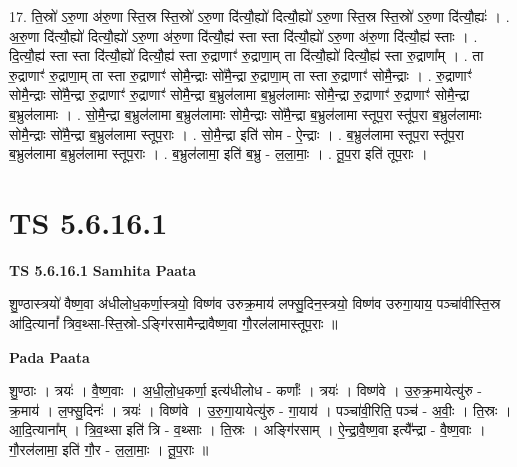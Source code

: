 \documentclass[17pt]{extarticle}
\begin{document}
17. ति॒स्रो॑ ऽरु॒णा अ॑रु॒णा स्ति॒स्र स्ति॒स्रो॑ ऽरु॒णा दि॑त्यौ॒ह्यो॑ दित्यौ॒ह्यो॑ ऽरु॒णा स्ति॒स्र स्ति॒स्रो॑ ऽरु॒णा दि॑त्यौ॒ह्यः॑ । . अ॒रु॒णा दि॑त्यौ॒ह्यो॑ दित्यौ॒ह्यो॑ ऽरु॒णा अ॑रु॒णा दि॑त्यौ॒ह्य॑ स्ता स्ता दि॑त्यौ॒ह्यो॑ ऽरु॒णा अ॑रु॒णा दि॑त्यौ॒ह्य॑ स्ताः । . दि॒त्यौ॒ह्य॑ स्ता स्ता दि॑त्यौ॒ह्यो॑ दित्यौ॒ह्य॑ स्ता रु॒द्राणाꣳ॑ रु॒द्राणा॒म् ता दि॑त्यौ॒ह्यो॑ दित्यौ॒ह्य॑ स्ता रु॒द्राणा᳚म् । . ता रु॒द्राणाꣳ॑ रु॒द्राणा॒म् ता स्ता रु॒द्राणाꣳ॑ सोमै॒न्द्राः सो॑मै॒न्द्रा रु॒द्राणा॒म् ता स्ता रु॒द्राणाꣳ॑ सोमै॒न्द्राः । . रु॒द्राणाꣳ॑ सोमै॒न्द्राः सो॑मै॒न्द्रा रु॒द्राणाꣳ॑ रु॒द्राणाꣳ॑ सोमै॒न्द्रा ब॒भ्रुल॑लामा ब॒भ्रुल॑लामाः सोमै॒न्द्रा रु॒द्राणाꣳ॑ रु॒द्राणाꣳ॑ सोमै॒न्द्रा ब॒भ्रुल॑लामाः । . सो॒मै॒न्द्रा ब॒भ्रुल॑लामा ब॒भ्रुल॑लामाः सोमै॒न्द्राः सो॑मै॒न्द्रा ब॒भ्रुल॑लामा स्तूप॒रा स्तू॑प॒रा ब॒भ्रुल॑लामाः सोमै॒न्द्राः सो॑मै॒न्द्रा ब॒भ्रुल॑लामा स्तूप॒राः । . सो॒मै॒न्द्रा इति॑ सोम - ऐ॒न्द्राः । . ब॒भ्रुल॑लामा स्तूप॒रा स्तू॑प॒रा ब॒भ्रुल॑लामा ब॒भ्रुल॑लामा स्तूप॒राः । . ब॒भ्रुल॑लामा॒ इति॑ ब॒भ्रु - ल॒ला॒माः॒ । . तू॒प॒रा इति॑ तूप॒राः । \newline
\pagebreak
{}

\section{ TS 5.6.16.1 }

\textbf{TS 5.6.16.1 } \newline
\textbf{Samhita Paata} \newline

शु॒ण्ठास्त्रयो॑ वैष्ण॒वा अ॑धीलोध॒कर्णा॒स्त्रयो॒ विष्ण॑व उरुक्र॒माय॑ लफ्सु॒दिन॒स्त्रयो॒ विष्ण॑व उरुगा॒याय॒ पञ्चा॑वीस्ति॒स्र आ॑दि॒त्यानां᳚ त्रिव॒थ्सा-स्ति॒स्रो-ऽङ्गि॑रसामैन्द्रावैष्ण॒वा गौ॒रल॑लामास्तूप॒राः ॥ \newline

\textbf{Pada Paata} \newline

शु॒ण्ठाः । त्रयः॑ । वै॒ष्ण॒वाः । अ॒धी॒लो॒ध॒कर्णा॒ इत्य॑धीलोध - कर्णाः᳚ । त्रयः॑ । विष्ण॑वे । उ॒रु॒क्र॒मायेत्यु॑रु - क्र॒माय॑ । ल॒फ्सु॒दिनः॑ । त्रयः॑ । विष्ण॑वे । उ॒रु॒गा॒यायेत्यु॑रु - गा॒याय॑ । पञ्चा॑वी॒रिति॒ पञ्च॑ - अ॒वीः॒ । ति॒स्रः । आ॒दि॒त्याना᳚म् । त्रि॒व॒थ्सा इति॑ त्रि - व॒थ्साः । ति॒स्रः । अङ्गि॑रसाम् । ऐ॒न्द्रा॒वै॒ष्ण॒वा इत्यै᳚न्द्रा - वै॒ष्ण॒वाः । गौ॒रल॑लामा॒ इति॑ गौ॒र - ल॒ला॒माः॒ । तू॒प॒राः ॥  \newline
\end{document}
